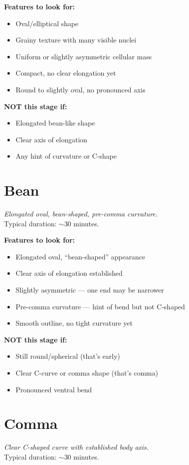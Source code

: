 \documentclass[11pt,letterpaper]{article}
\begin{document}
\textbf{Features to look for:}
\begin{itemize}
    \item Oval/elliptical shape
    \item Grainy texture with many visible nuclei
    \item Uniform or slightly asymmetric cellular mass
    \item Compact, no clear elongation yet
    \item Round to slightly oval, no pronounced axis
\end{itemize}

\textbf{NOT this stage if:}
\begin{itemize}
    \item Elongated bean-like shape
    \item Clear axis of elongation
    \item Any hint of curvature or C-shape
\end{itemize}

\section{Bean}
\textit{Elongated oval, bean-shaped, pre-comma curvature.}\\
Typical duration: $\sim$30 minutes.

\textbf{Features to look for:}
\begin{itemize}
    \item Elongated oval, ``bean-shaped'' appearance
    \item Clear axis of elongation established
    \item Slightly asymmetric --- one end may be narrower
    \item Pre-comma curvature --- hint of bend but not C-shaped
    \item Smooth outline, no tight curvature yet
\end{itemize}

\textbf{NOT this stage if:}
\begin{itemize}
    \item Still round/spherical (that's early)
    \item Clear C-curve or comma shape (that's comma)
    \item Pronounced ventral bend
\end{itemize}

\section{Comma}
\textit{Clear C-shaped curve with established body axis.}\\
Typical duration: $\sim$30 minutes.
\end{document}
